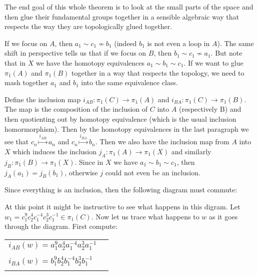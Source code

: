 \documentclass[11pt]{amsart}
\begin{document}
The end goal of this whole theorem is to look at the small parts of the space and then glue their fundamental groups together in a sensible algebraic way that respects the way they are topologically glued together.

If we focus on $A$, then $a_1 \sim c_1 \not \sim b_1$ (indeed $b_1$ is not even a loop in $A$). The same shift in perspective tells us that if we focus on $B$, then $b_1 \sim c_1 \not \sim a_1$.
But note that in $X$ we have the homotopy equivalences
$a_1 \sim b_1 \sim c_1$.
If we want to glue $\pi_1(A)$ and $\pi_1(B)$ together in a way that respects the topology, we need to mash together $a_1$ and $b_1$ into the same equivalence class.

Define the inclusion map $i_{AB}: \pi_1(C) \rightarrow \pi_1(A)$ and $i_{BA}: \pi_1(C) \rightarrow \pi_1(B)$. The map is the composition of the inclusion of $C$ into $A$ (respectively B) and then quotienting out by homotopy equivalence (which is the usual inclusion homormorphism). Then by the homotopy equivalences in the last paragraph we see that $c_n \stackrel{i_{AB}}{\mapsto} a_n$ and 
$c_n \stackrel{i_{BA}}{\mapsto} b_n$. 
Then we also have the inclusion map from $A$ into $X$ which induces the inclusion $j_A: \pi_1(A) \rightarrow \pi_1(X)$ and similarly $j_B: \pi_1(B) \rightarrow \pi_1(X)$.
Since in $X$ we have $a_1 \sim b_1 \sim c_1$, then $j_A(a_1) = j_B(b_1)$, otherwise $j$ could not even be an inclusion.

Since everything is an inclusion, then the following diagram must commute:
\begin{center}
\end{center}

At this point it might be instructive to see what happens in this digram.
Let $w_1 = c_1^9c_2^4c_1^{-4}c_2^3c_1^{-1} \in \pi_1(C)$. Now let us trace what happens to $w$ as it goes through the diagram. First compute:

\begin{center}
	\begin{tabular}{l l}\\
		$i_{AB}(w) = a_1^9a_2^4a_1^{-4}a_2^3a_1^{-1} $\\
		\\
		$i_{BA}(w) = b_1^9b_2^4b_1^{-4}b_2^3b_1^{-1} $\\ \\
	\end{tabular}
\end{center}
\end{document}
